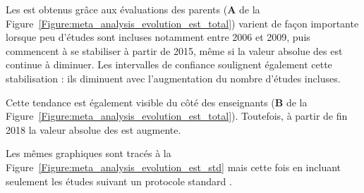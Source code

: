 Les \gls{est} obtenus grâce aux évaluations des parents (\textbf{A} de la Figure~\ref{Figure:meta_analysis_evolution_est_total}) varient de façon 
importante lorsque peu d'études sont incluses notamment entre 2006 et 2009, puis commencent à se stabiliser à 
partir de 2015, même si la valeur absolue des \gls{est} continue à diminuer. Les intervalles de confiance soulignent également cette stabilisation : ils diminuent 
avec l'augmentation du nombre d'études incluses. 

Cette tendance est également visible du côté des enseignants (\textbf{B} de la Figure~\ref{Figure:meta_analysis_evolution_est_total}). Toutefois, à partir 
de fin 2018 la valeur absolue des \gls{est} augmente.

Les mêmes graphiques sont tracés à la Figure~\ref{Figure:meta_analysis_evolution_est_std} mais cette fois en incluant seulement 
les études suivant un protocole standard \citep{Arns2014}.

